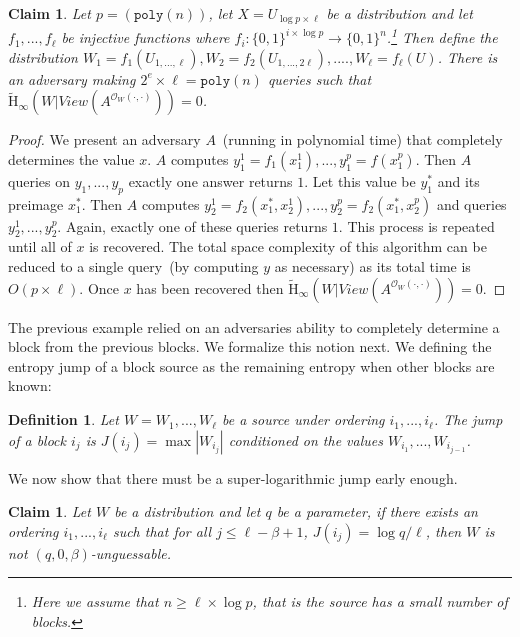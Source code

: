 \documentclass[11pt]{article}
\newcommand{\zo}{\ensuremath{\{0, 1\}}}
\newcommand{\poly}{\ensuremath{\mathtt{poly}}\xspace}
\newcommand{\Hav}{\tilde{\mathrm{H}}_\infty}
\newtheorem{definition}[theorem]{Definition}
\newtheorem{claim}[theorem]{Claim}
\begin{document}
\begin{claim}
Let $p = (\poly(n))$, let $X = U_{\log p\times \ell}$ be a distribution and let $f_1,..., f_{\ell}$ be injective functions where $f_i:\zo^{i\times \log p}\rightarrow \zo^n$.\footnote{Here we assume that $n\ge \ell \times \log p$, that is the source has a small number of blocks.}  Then define the distribution $W_1 = f_1(U_{1,...,\ell}), W_2 = f_2(U_{1,..., 2\ell}),...., W_\ell = f_\ell(U)$.  There is an adversary making $2^e\times \ell = \poly(n)$ queries such that $\Hav(W | View(A^{\mathcal{O}_W(\cdot, \cdot)})) = 0$.
\end{claim}
\begin{proof}
We present an adversary $A$~(running in polynomial time) that completely determines the value $x$.  $A$ computes $y_1^1 = f_1(x_1^1),..., y_1^p = f(x_1^p)$.  Then $A$ queries on $y_1,..., y_p$ exactly one answer returns $1$.  Let this value be $y_1^*$ and its preimage $x_1^*$.  Then $A$ computes $y_2^1 = f_2(x_1^*,x_2^1), ..., y_2^p= f_2(x_1^*, x_2^p)$ and queries $y_2^1,..., y_2^p$.  Again, exactly one of these queries returns $1$.  This process is repeated until all of $x$ is recovered.  The total space complexity of this algorithm can be reduced to a single query~(by computing $y$ as necessary) as its total time is $O(p\times \ell)$.  Once $x$ has been recovered then $\Hav(W | View(A^{\mathcal{O}_W(\cdot, \cdot)})) = 0$.
\end{proof}

The previous example relied on an adversaries ability to completely determine a block from the previous blocks.  We formalize this notion next.  We defining the entropy jump of a block source as the remaining entropy when other blocks are known:

\begin{definition}
Let $W = W_1,..., W_\ell$ be a source under ordering $i_1,..., i_\ell$.  The \emph{jump} of a block $i_j$ is $J(i_j) = \max|W_{i_j} |$ conditioned on the values $W_{i_1},..., W_{i_{j-1}}$.
\end{definition}

\noindent
We now show that there must be a super-logarithmic jump early enough.

\begin{claim}
Let $W$ be a distribution and let $q$ be a parameter, if there exists an ordering $i_1,..., i_\ell$ such that for all $j\le \ell-\beta +1$, $J(i_j) = \log q /\ell$, then $W$ is not $(q, 0, \beta)$-unguessable.
\end{claim}
\end{document}
